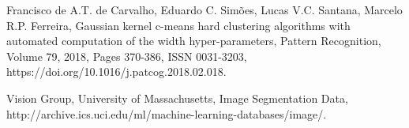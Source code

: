 \documentclass[conference]{IEEEtran}
\begin{document}
\begin{thebibliography}{00}
 Francisco de A.T. de Carvalho, Eduardo C. Simões, Lucas V.C. Santana, Marcelo R.P. Ferreira,
Gaussian kernel c-means hard clustering algorithms with automated computation of the width hyper-parameters,
Pattern Recognition,
Volume 79,
2018,
Pages 370-386,
ISSN 0031-3203,
https://doi.org/10.1016/j.patcog.2018.02.018.

 Vision Group, University of Massachusetts, 
Image Segmentation Data,
http://archive.ics.uci.edu/ml/machine-learning-databases/image/.

\end{thebibliography}
\end{document}
